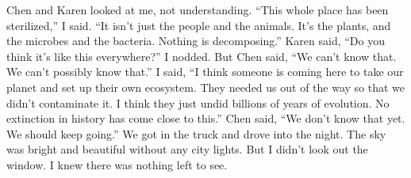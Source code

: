 \documentclass[a4paper]{article}
\begin{document}
Chen and Karen looked at me, not understanding.
“This whole place has been sterilized,” I said. “It isn’t just the people and the animals. It’s the plants, and the microbes and the bacteria. Nothing is decomposing.”
Karen said, “Do you think it’s like this everywhere?”
I nodded. But Chen said, “We can’t know that. We can’t possibly know that.”
I said, “I think someone is coming here to take our planet and set up their own ecosystem. They needed us out of the way so that we didn’t contaminate it. I think they just undid billions of years of evolution. No extinction in history has come close to this.”
Chen said, “We don’t know that yet. We should keep going.”
We got in the truck and drove into the night.
The sky was bright and beautiful without any city lights. But I didn’t look out the window. I knew there was nothing left to see.
\end{document}
